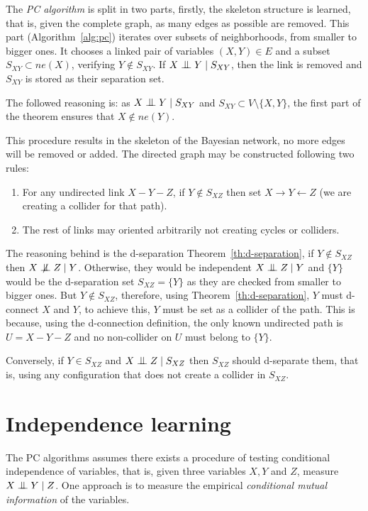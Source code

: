 The \emph{PC algorithm} is split in two parts, firstly, the skeleton structure is learned, that is, given the complete graph, as many edges as possible are removed. This part (Algorithm~\ref{alg:pc}) iterates over subsets of neighborhoods, from smaller to bigger ones. It chooses a linked pair of variables \((X,Y) \in E\) and
a subset \(S_{XY} \subset ne(X)\), verifying \(Y \notin S_{XY}\). If \(X \bigCI Y \mid S_{XY}\), then the link is removed and \(S_{XY}\) is stored as their separation set.

The followed reasoning is: as \(X \bigCI Y \mid S_{XY}\) and \(S_{XY} \subset V \setminus \{X,Y\}\), the first part of the theorem ensures that \(X \notin ne(Y)\).

This procedure results in the skeleton of the Bayesian network, no more edges will be removed or added. The directed graph may be constructed following two rules:
\begin{enumerate}
  \item For any undirected link \(X - Y - Z\), if \(Y \notin S_{XZ}\) then set
    \(X \to Y \leftarrow Z\) (we are creating a collider for that path).
  \item The rest of links may oriented arbitrarily not
creating cycles or colliders.
\end{enumerate}
The reasoning behind is the d-separation Theorem~\ref{th:d-separation}, if \(Y \notin S_{XZ}\) then \(X \bigCD Z \mid Y\). Otherwise, they would be independent \(X \bigCI Z \mid Y\) and \(\{Y\}\) would be the d-separation set \(S_{XZ} = \{Y\}\) as they are checked from smaller to bigger ones. But \(Y \notin S_{XZ}\), therefore, using Theorem~\ref{th:d-separation}, \(Y\) must d-connect \(X\) and \(Y\), to achieve this, \(Y\)  must be set as a collider of the path. This is because, using the d-connection definition, the only known undirected path is \(U = X - Y - Z\) and no non-collider on \(U\) must belong to \(\{Y\}\).

Conversely, if \(Y \in S_{XZ}\) and \(X \bigCI Z \mid S_{XZ}\) then \(S_{XZ}\) should d-separate them, that is, using any configuration that does not create a collider in \(S_{XZ}\).

\section{Independence learning}

The PC algorithms assumes there exists a procedure of testing conditional independence of variables, that is, given three variables \(X, Y\) and \( Z \),  measure \(X \bigCI Y \mid Z\). One approach is to measure the empirical \emph{conditional mutual information} of the variables.

